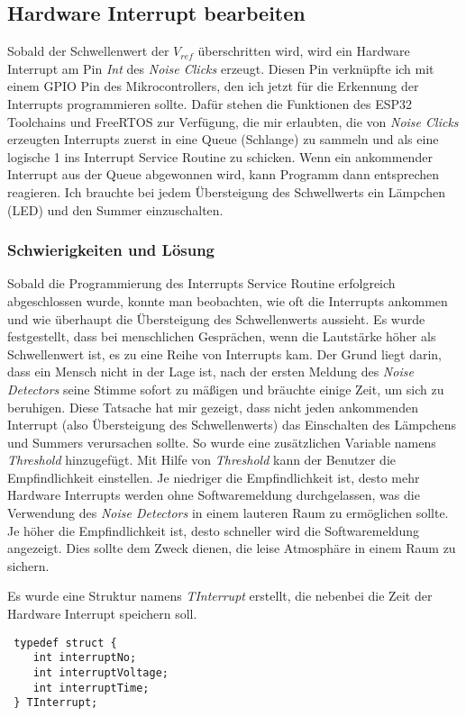 \subsection{Hardware Interrupt bearbeiten}
\label{sec:main:interrupt}
Sobald der Schwellenwert der $V_{ref}$ überschritten wird, wird ein Hardware Interrupt am Pin \textit{Int} des \textit{Noise Clicks} erzeugt. Diesen Pin verknüpfte ich mit einem GPIO Pin des Mikrocontrollers, den ich jetzt für die Erkennung der Interrupts programmieren sollte. Dafür stehen die Funktionen des ESP32 Toolchains und FreeRTOS zur Verfügung, die mir erlaubten, die von \textit{Noise Clicks} erzeugten Interrupts zuerst in eine Queue (Schlange) zu sammeln und als eine logische 1 ins Interrupt Service Routine zu schicken. Wenn ein ankommender Interrupt aus der Queue abgewonnen wird, kann Programm dann entsprechen reagieren. Ich brauchte bei jedem Übersteigung des Schwellwerts ein Lämpchen (LED) und den Summer einzuschalten.  
\subsubsection{Schwierigkeiten und Lösung}
Sobald die Programmierung des Interrupts Service Routine erfolgreich abgeschlossen wurde, konnte man beobachten, wie oft die Interrupts ankommen und wie überhaupt die Übersteigung des Schwellenwerts aussieht. Es wurde festgestellt, dass bei menschlichen Gesprächen, wenn die Lautstärke höher als Schwellenwert ist, es zu eine Reihe von Interrupts kam. Der Grund liegt darin, dass ein Mensch nicht in der Lage ist, nach der ersten Meldung des \textit{Noise Detectors} seine Stimme sofort zu mäßigen und bräuchte einige Zeit, um sich zu beruhigen. Diese Tatsache hat mir gezeigt, dass nicht jeden ankommenden Interrupt (also Übersteigung des Schwellenwerts) das Einschalten des Lämpchens und Summers verursachen sollte. So wurde eine zusätzlichen Variable namens \textit{Threshold} hinzugefügt. Mit Hilfe von \textit{Threshold} kann der Benutzer die Empfindlichkeit einstellen. Je niedriger die Empfindlichkeit ist, desto mehr Hardware Interrupts werden ohne Softwaremeldung durchgelassen, was die Verwendung des \textit{Noise Detectors} in einem lauteren Raum zu ermöglichen sollte. Je höher die Empfindlichkeit ist, desto schneller wird die Softwaremeldung angezeigt. Dies sollte dem Zweck dienen, die leise Atmosphäre in einem Raum zu sichern.

 Es wurde eine Struktur namens \textit{TInterrupt} erstellt, die nebenbei die Zeit der Hardware Interrupt speichern soll.
 \begin{lstlisting}
 typedef struct {
 	int interruptNo;
 	int interruptVoltage;
 	int interruptTime;	
 } TInterrupt; 
\end{lstlisting}

